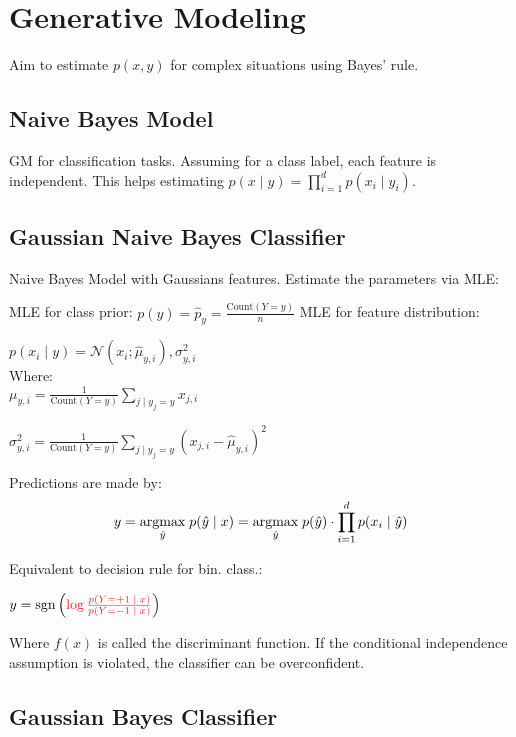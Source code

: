 \section*{Generative Modeling}

Aim to estimate $p(x, y)$ for complex situations using Bayes' rule.

\subsection*{Naive Bayes Model}

GM for classification tasks. Assuming for a class label, each feature is independent. This helps estimating $p( x \; | \; y) =\prod_{i=1}^d p(x_i \; | \; y_i)$.

\subsection*{Gaussian Naive Bayes Classifier}

Naive Bayes Model with Gaussians features. Estimate the parameters via MLE:

MLE for class prior: $p(y) = \hat p_y = \frac{\text{Count}(Y = y)}{n}$
MLE for feature distribution:

\qquad \qquad $p(x_i \; | \; y) = \mathcal{N}(x_i; \hat \mu_{y,i}), \sigma^2_{y,i}$ \\[-13pt]

Where:\\[-10pt]

\qquad \quad $\mu_{y,i} = \frac{1}{\text{Count}(Y = y)} \sum_{j \; | \; y_j = y} x_{j,i}$

\qquad \quad $\sigma^2_{y,i} = \frac{1}{\text{Count}(Y = y)} \sum_{j \; | \; y_j = y} (x_{j,i} - \hat \mu_{y, i})^2$


Predictions are made by: \\[-15pt]
$$y = \underset{\hat y}{\text{argmax}} \; p(\hat y \; | \; x) = \underset{\hat y}{\text{argmax}} \; p(\hat y) \cdot \prod_{i=1}^d p(x_i \; | \; \hat y)$$

Equivalent to decision rule for bin. class.:

\qquad \qquad $y = \sgn \left( \color{Red} \log \frac{p(Y = +1 \; | \; x)}{p(Y = -1 \; | \; x)} \color{Black}\right)$

Where \color{Red}$f(x)$\color{Black} is called the discriminant function. If the conditional independence assumption is violated, the classifier can be overconfident.

\subsection*{Gaussian Bayes Classifier}

